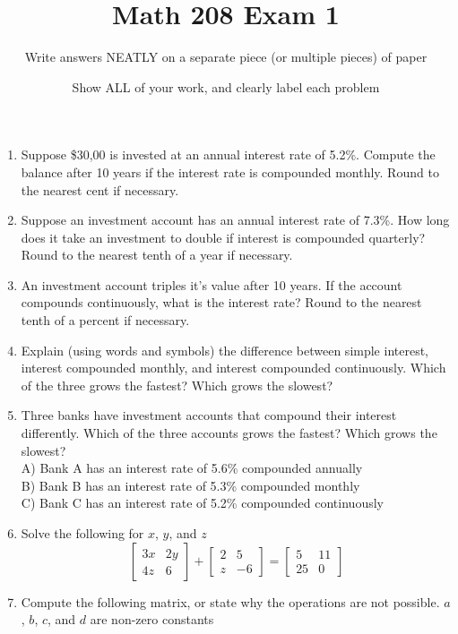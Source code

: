 \documentclass{article}
\title{Math 208 Exam 1}
\author{Write answers NEATLY on a separate piece (or multiple pieces) of paper}
\date{Show ALL of your work, and clearly label each problem}
\begin{document}
\maketitle

\newpage
        \begin{enumerate}
        \item Suppose \$30,00 is invested at an annual interest rate of 5.2\%.  Compute the balance after 10 years if the interest rate is compounded monthly.  Round to the nearest cent if necessary.
        \item Suppose an investment account has an annual interest rate of 7.3\%.  How long does it take an investment to double if interest is compounded quarterly?  Round to the nearest tenth of a year if necessary.
        \item An investment account triples it's value after 10 years.  If the account compounds continuously, what is the interest rate?  Round to the nearest tenth of a percent if necessary.
        \item Explain (using words and symbols) the difference between simple interest, interest compounded monthly, and interest compounded continuously.  Which of the three grows the fastest?  Which grows the slowest?
        \item Three banks have investment accounts that compound their interest differently.  Which of the three accounts grows the fastest?  Which grows the slowest? \\
        A) Bank A has an interest rate of 5.6\% compounded annually \\
        B) Bank B has an interest rate of 5.3\% compounded monthly \\
        C) Bank C has an interest rate of 5.2\% compounded continuously
        \item Solve the following for $x$, $y$, and $z$
        \[\begin{bmatrix}
        3x & 2y \\ 
        4z & 6
        \end{bmatrix} +
        \begin{bmatrix}
        2 & 5 \\
        z & -6
        \end{bmatrix} =
        \begin{bmatrix}
        5 & 11 \\
        25 & 0
        \end{bmatrix}\]
        \item Compute the following matrix, or state why the operations are not possible.  $a$, $b$, $c$, and $d$ are non-zero constants \\

\end{enumerate}
\end{document}
